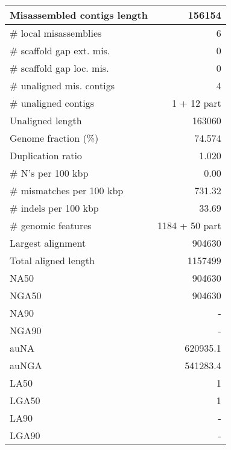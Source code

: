 \documentclass[12pt,a4paper]{article}
\begin{document}
\begin{table}[ht]
\begin{center}
\begin{tabular}{|l*{1}{|r}|}
Misassembled contigs length & 156154 \\ \hline
\# local misassemblies & 6 \\ \hline
\# scaffold gap ext. mis. & 0 \\ \hline
\# scaffold gap loc. mis. & 0 \\ \hline
\# unaligned mis. contigs & 4 \\ \hline
\# unaligned contigs & 1 + 12 part \\ \hline
Unaligned length & 163060 \\ \hline
Genome fraction (\%) & 74.574 \\ \hline
Duplication ratio & 1.020 \\ \hline
\# N's per 100 kbp & 0.00 \\ \hline
\# mismatches per 100 kbp & 731.32 \\ \hline
\# indels per 100 kbp & 33.69 \\ \hline
\# genomic features & 1184 + 50 part \\ \hline
Largest alignment & 904630 \\ \hline
Total aligned length & 1157499 \\ \hline
NA50 & 904630 \\ \hline
NGA50 & 904630 \\ \hline
NA90 & - \\ \hline
NGA90 & - \\ \hline
auNA & 620935.1 \\ \hline
auNGA & 541283.4 \\ \hline
LA50 & 1 \\ \hline
LGA50 & 1 \\ \hline
LA90 & - \\ \hline
LGA90 & - \\ \hline
\end{tabular}
\end{center}
\end{table}
\end{document}
